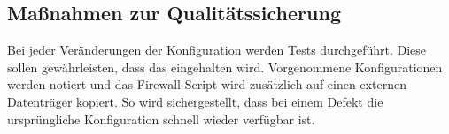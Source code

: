 \subsection{Maßnahmen zur Qualitätssicherung}
\label{sec:Qualitaetssicherung}
Bei jeder Veränderungen der Konfiguration werden Tests durchgeführt. Diese sollen gewährleisten, dass das  eingehalten wird. Vorgenommene Konfigurationen werden notiert und das Firewall-Script wird zusätzlich auf einen externen Datenträger kopiert. So wird sichergestellt, dass bei einem Defekt die ursprüngliche Konfiguration schnell wieder verfügbar ist.

